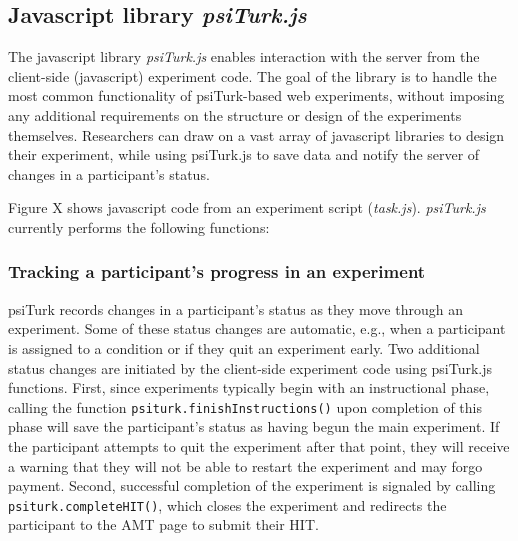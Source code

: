 \documentclass[twocolumn]{svjour3}          %
\begin{document}
%
%
%
%
%



\subsection{Javascript library \emph{psiTurk.js}}

The javascript library \emph{psiTurk.js} enables interaction with the server from the client-side (javascript) experiment code.
The goal of the library is to handle the most common functionality of psiTurk-based web experiments, without imposing any additional requirements on the structure or design of the experiments themselves.
Researchers can draw on a vast array of javascript libraries to design their experiment, while using psiTurk.js to save data and notify the server of changes in a participant's status.

Figure X shows javascript code from an experiment script (\emph{task.js}). 
\emph{psiTurk.js} currently performs the following functions:


\subsubsection{Tracking a participant's progress in an experiment} 

psiTurk records changes in a participant's status as they move through an experiment. 
Some of these status changes are automatic, e.g., when a participant is assigned to a condition or if they quit an experiment early. 
Two additional status changes are initiated by the client-side experiment code using psiTurk.js functions.
First, since experiments typically begin with an instructional phase, calling the function \texttt{psiturk.finishInstructions()} upon completion of this phase will save the participant's status as having begun the main experiment.
If the participant attempts to quit the experiment after that point, they will receive a warning that they will not be able to restart the experiment and may forgo payment.
Second, successful completion of the experiment is signaled by calling \texttt{psiturk.completeHIT()}, which closes the experiment and redirects the participant to the AMT page to submit their HIT.
\end{document}

